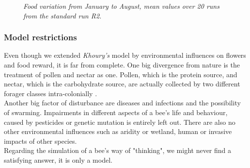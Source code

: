 		\begin{figure}[H]
			\centering
			\caption{\textit{Food variation from January to August, mean values over 20 runs from the standard run R2.}}
			\label{fig:foodVariation}
		\end{figure}
	
	\subsubsection{Model restrictions}
		Even though we extended \textit{Khoury's} model by environmental influences on flowers and food reward, it is far from complete. One big divergence from nature is the treatment of pollen and nectar as one. Pollen, which is the protein source, and nectar, which is the carbohydrate source, are actually collected by two different forager classes intra-colonially \cite{schmickl07}.\\  Another big factor of disturbance are diseases and infections and the possibility of swarming. Impairments in different aspects of a bee's life and behaviour, caused by pesticides or genetic mutation is entirely left out. There are also no other environmental influences such as aridity or wetland, human or invasive impacts of other species. \\
		Regarding the simulation of a bee's way of "thinking", we might never find a satisfying answer, it is only a model.
	
